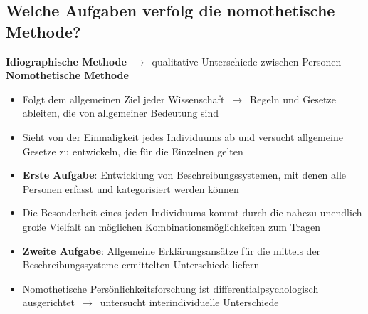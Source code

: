 \documentclass[a6paper,9pt,DIV=14]{scrartcl}
\begin{document}
\subsection{Welche Aufgaben verfolg die nomothetische Methode?} %
    \textbf{Idiographische Methode} $\,\to\,$ qualitative Unterschiede zwischen Personen\\
    \textbf{Nomothetische Methode}
    \begin{itemize}\itemsep-0.5ex
        \item Folgt dem allgemeinen Ziel jeder Wissenschaft $\,\to\,$ Regeln und Gesetze ableiten, die von allgemeiner Bedeutung sind
        \item Sieht von der Einmaligkeit jedes Individuums ab und versucht allgemeine Gesetze zu entwickeln, die für die Einzelnen gelten
        \item \textbf{Erste Aufgabe}: Entwicklung von Beschreibungssystemen, mit denen alle Personen erfasst und kategorisiert werden können
        \item Die Besonderheit eines jeden Individuums kommt durch die nahezu unendlich große Vielfalt an möglichen Kombinationsmöglichkeiten zum Tragen
        \item \textbf{Zweite Aufgabe}: Allgemeine Erklärungsansätze für die mittels der Beschreibungssysteme ermittelten Unterschiede liefern
        \item Nomothetische Persönlichkeitsforschung ist differentialpsychologisch ausgerichtet $\,\to\,$ untersucht interindividuelle Unterschiede
    \end{itemize}
\end{document}
